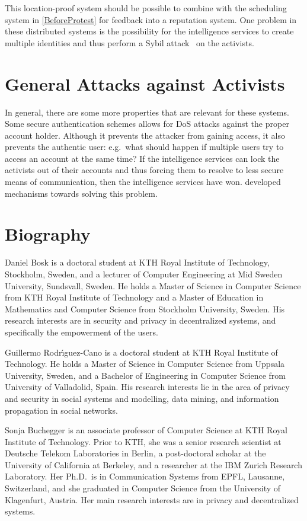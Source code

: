 \documentclass[a4paper]{llncs}
\begin{document}
This location-proof system should be possible to combine with the scheduling 
system in \cref{BeforeProtest} for feedback into a reputation system.
One problem in these distributed systems is the possibility for the 
intelligence services to create multiple identities and thus perform a Sybil 
attack~\cite{SybilAttack} on the activists.

\section{General Attacks against Activists}
\label{GeneralAttacks}

In general, there are some more properties that are relevant for these systems.
Some secure authentication schemes allows for \ac{DoS} attacks against the 
proper account holder.
Although it prevents the attacker from gaining access, it also prevents the 
authentic user:
e.g.\ what should happen if multiple users try to access an account at the same 
time?
If the intelligence services can lock the activists out of their accounts and 
thus forcing them to resolve to less secure means of communication, then the 
intelligence services have won.
\citet{P2PPasswords} developed mechanisms towards solving this problem.


\printbibliography{}


\appendix
\section{Biography}
\label{Biography}

Daniel Bosk is a doctoral student at KTH Royal Institute of Technology, 
Stockholm, Sweden, and a lecturer of Computer Engineering at Mid Sweden 
University, Sundsvall, Sweden.
He holds a Master of Science in Computer Science from KTH Royal Institute of 
Technology and a Master of Education in Mathematics and Computer Science from 
Stockholm University, Sweden.
His research interests are in security and privacy in decentralized systems, 
and specifically the empowerment of the users.

Guillermo Rodr\'{\i}guez-Cano is a doctoral student at KTH Royal Institute of 
Technology.
He holds a Master of Science in Computer Science from Uppsala University, 
Sweden, and a Bachelor of Engineering in Computer Science from University of 
Valladolid, Spain.
His research interests lie in the area of privacy and security in social 
systems and modelling, data mining, and information propagation in social 
networks.

Sonja Buchegger is an associate professor of Computer Science at KTH Royal 
Institute of Technology.
Prior to KTH, she was a
senior research scientist at Deutsche Telekom Laboratories in Berlin,
a post-doctoral scholar at the University of California at Berkeley,
and a researcher at the IBM Zurich Research Laboratory.
Her Ph.D.\ is in Communication Systems from EPFL, Lausanne, Switzerland, and 
she graduated in Computer Science from the University of Klagenfurt, Austria.
Her main research interests are in privacy and decentralized systems.
\end{document}

